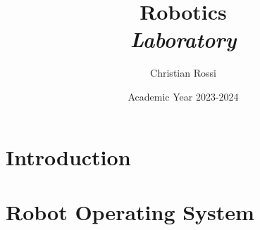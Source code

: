 \documentclass[12pt, a4paper]{report}
\title{Robotics \\ \textit{Laboratory}}
\author{Christian Rossi}
\date{Academic Year 2023-2024}
\begin{document}
    \maketitle

    

    \cleardoublepage

    \tableofcontents

    \cleardoublepage

    \chapter{Introduction}
    

    \chapter{Robot Operating System}
    
    
\end{document}

